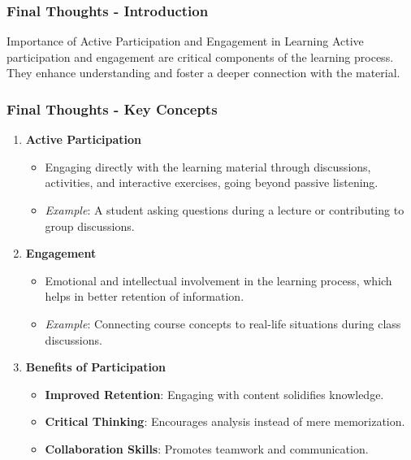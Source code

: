 \documentclass[aspectratio=169]{beamer}
\begin{document}
\begin{frame}[fragile]
    \frametitle{Final Thoughts - Introduction}
    \begin{block}{Importance of Active Participation and Engagement in Learning}
        Active participation and engagement are critical components of the learning process. They enhance understanding and foster a deeper connection with the material.
    \end{block}
\end{frame}

\begin{frame}[fragile]
    \frametitle{Final Thoughts - Key Concepts}
    \begin{enumerate}
        \item \textbf{Active Participation}
        \begin{itemize}
            \item Engaging directly with the learning material through discussions, activities, and interactive exercises, going beyond passive listening.
            \item \textit{Example}: A student asking questions during a lecture or contributing to group discussions.
        \end{itemize}
        
        \item \textbf{Engagement}
        \begin{itemize}
            \item Emotional and intellectual involvement in the learning process, which helps in better retention of information.
            \item \textit{Example}: Connecting course concepts to real-life situations during class discussions.
        \end{itemize}
        
        \item \textbf{Benefits of Participation}
        \begin{itemize}
            \item \textbf{Improved Retention}: Engaging with content solidifies knowledge.
            \item \textbf{Critical Thinking}: Encourages analysis instead of mere memorization.
            \item \textbf{Collaboration Skills}: Promotes teamwork and communication.
        \end{itemize}
    \end{enumerate}
\end{frame}
\end{document}
